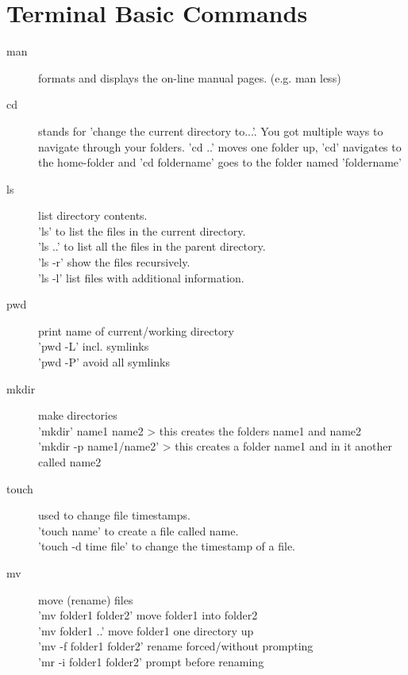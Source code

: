 \documentclass[10pt,a4paper]{scrartcl}
\begin{document}
\section{Terminal Basic Commands}
\begin{description}

\item[man]
formats and displays the on-line manual pages. (e.g. man less)

\item[cd] 
stands for 'change the current directory to...'. You got multiple ways to navigate through your folders. 'cd ..' moves one folder up, 'cd' navigates to the home-folder and 'cd foldername' goes to the folder named 'foldername' 

\item[ls]
list directory contents. \\
'ls' to list the files in the current directory.\\ 
'ls ..' to list all the files in the parent directory.\\ 
'ls -r' show the files recursively. \\
'ls -l' list files with additional information.

\item[pwd]
print name of current/working directory\\
'pwd -L' incl. symlinks\\
'pwd -P' avoid all symlinks

\item[mkdir]
make directories\\
'mkdir' name1 name2 > this creates the folders name1 and name2\\
'mkdir -p name1/name2' > this creates a folder name1 and in it another called name2

\item[touch]
used to change file timestamps. \\
'touch name' to create a file called name.\\
'touch -d time file' to change the timestamp of a file.

\item[mv]
move (rename) files\\
'mv folder1 folder2' move folder1 into folder2\\
'mv folder1 ..' move folder1 one directory up\\
'mv -f folder1 folder2' rename forced/without prompting\\
'mr -i folder1 folder2' prompt before renaming


\end{description}
\end{document}
